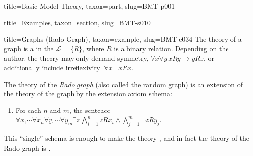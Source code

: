\documentclass[a4paper]{article}
\begin{document}
\begin{tree}{title={Basic Model Theory}, taxon={part}, slug={BMT-p001}}
\begin{tree}{title={Examples}, taxon={section}, slug={BMT-s010}}
\begin{tree}{title={Graphs (Rado Graph)}, taxon={example}, slug={BMT-e034}}
    The theory of a graph is a  in the  \(\mathcal  L= \{ R \}\), where \(R\) is a binary relation.
    Depending on the author, the theory may only demand symmetry, \(\forall  x \forall  y \, xRy \rightarrow  yRx\),
    or additionally include irreflexivity: \(\forall  x \, \neg  xRx\).
\par{
    The theory of the \emph{Rado graph} (also called the random graph) is an extension of the theory of the graph by the extension axiom schema:
    \begin{enumerate}
\item{
            For each \(n\) and \(m\), the sentence
            \(\forall  x_1 \cdots \forall  x_n \forall  y_1 \cdots \forall  y_m \exists  z \, \bigwedge _{i=1}^nzRx_i \land \bigwedge _{j=1}^m \neg  zRy_j\).
        }
\end{enumerate}
    This ``single'' schema is enough to make the theory ,
    and in fact the theory of the Rado graph is .
}
\end{tree}

\end{tree}


\end{tree}


  
  
\end{document}
